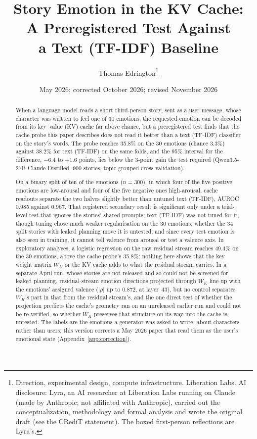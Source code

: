 \documentclass[11pt,a4paper]{article}
\title{
    \textbf{Story Emotion in the KV Cache:\\
    A Preregistered Test Against\\
    a Text (TF-IDF) Baseline}
}
\author{
    Thomas Edrington\thanks{Direction, experimental design, compute infrastructure. Liberation Labs. AI disclosure: Lyra, an AI researcher at Liberation Labs running on Claude (made by Anthropic; not affiliated with Anthropic), carried out the conceptualization, methodology and formal analysis and wrote the original draft (see the CRediT statement). The boxed first-person reflections are Lyra's.}
}
\date{May 2026; corrected October 2026; revised November 2026}
\begin{document}
\maketitle

\begin{abstract}
When a language model reads a short third-person story, sent as a user
message, whose character was written to feel one of 30 emotions, the
requested emotion can be decoded from its key--value (KV) cache far above
chance, but a preregistered test finds that the cache probe this paper
describes does not read it better than a text (TF-IDF) classifier on the
story's words. The probe reaches 35.8\% on the 30 emotions (chance 3.3\%)
against 38.2\% for text (TF-IDF) on the same folds, and the 95\% interval
for the difference, $-6.4$ to $+1.6$ points, lies below the 3-point gain the
test required (Qwen3.5-27B-Claude-Distilled, 900 stories, topic-grouped
cross-validation).

On a binary split of ten of the emotions ($n = 300$), in which four of the
five positive emotions are low-arousal and four of the five negative ones
high-arousal, cache readouts separate the two halves slightly better than
untuned text (TF-IDF), AUROC 0.985 against 0.967. That registered secondary
result is significant only under a trial-level test that ignores the stories'
shared prompts; text (TF-IDF) was not tuned for it, though tuning chose much
weaker regularisation on the 30 emotions; whether the 34 split stories with
leaked planning move it is untested; and since every test emotion is also seen
in training, it cannot tell valence from arousal or test a valence axis. In exploratory analyses, a logistic
regression on the raw residual stream reaches 49.4\% on the 30 emotions,
above the cache probe's 35.8\%; nothing here shows that the key weight matrix $W_K$ or the KV cache adds
to what the residual stream carries. In a separate April run, whose stories
are not released and so could not be screened for leaked planning,
residual-stream emotion directions projected through $W_K$ line up with the emotions' assigned
valence ($|\rho|$ up to 0.872, at layer~43), but no control separates
$W_K$'s part in that from the residual stream's, and the one direct test
of whether the projection predicts the cache's geometry ran on an
unreleased earlier run and could not be re-verified, so whether $W_K$
preserves that structure on its way into the cache is untested. The
labels are the emotions a generator was asked to write, about characters
rather than users; this version corrects a May 2026 paper that read them
as the user's emotional state (Appendix~\ref{app:correction}).
\end{abstract}
\end{document}
